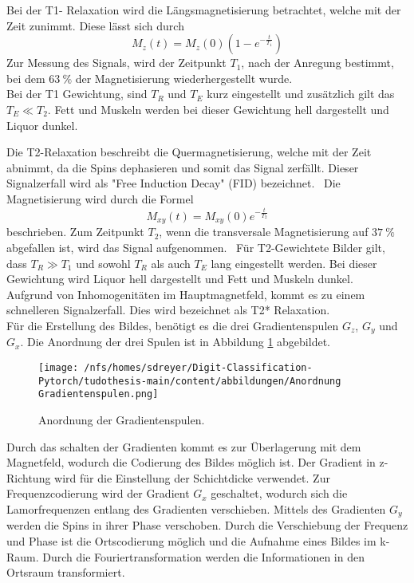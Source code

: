 Bei der T1- Relaxation wird die Längsmagnetisierung betrachtet, welche mit der Zeit zunimmt.
Diese lässt sich durch 
\begin{equation}
    M_z(t) = M_z(0) (1 - e^{-\frac{t}{T_1}})
\end{equation}
Zur Messung des Signals, wird der Zeitpunkt $T_1$, nach der Anregung bestimmt, bei dem $\qty{63}{\%}$ der Magnetisierung wiederhergestellt wurde.~\cite{Pollmann}\\
Bei der T1 Gewichtung, sind $T_R$ und $T_E$ kurz eingestellt und zusätzlich gilt das $T_E \ll T_2$.
Fett und Muskeln werden bei dieser Gewichtung hell dargestellt und Liquor dunkel.~\cite{Schlegel}

Die T2-Relaxation beschreibt die Quermagnetisierung, welche mit der Zeit abnimmt, da die Spins dephasieren und somit das Signal zerfällt.
Dieser Signalzerfall wird als "Free Induction Decay" (FID) bezeichnet.~\cite{Dössel}
Die Magnetisierung wird durch die Formel
\begin{equation}
    M_{xy}(t) = M_{xy}(0) e^{-\frac{t}{T_2}} 
\end{equation}
beschrieben.
Zum Zeitpunkt $T_2$, wenn die transversale Magnetisierung auf $\qty{37}{\%}$ abgefallen ist, wird das Signal aufgenommen.~\cite{Pollmann}
Für T2-Gewichtete Bilder gilt, dass $T_R \gg T_1$ und sowohl $T_R$ als auch $T_E$  lang eingestellt werden. 
Bei dieser Gewichtung wird Liquor hell dargestellt und Fett und Muskeln dunkel.~\cite{Schlegel} 
Aufgrund von Inhomogenitäten im Hauptmagnetfeld, kommt es zu einem schnelleren Signalzerfall. Dies wird bezeichnet als T2* Relaxation.~\cite{Dössel}\\


Für die Erstellung des Bildes, benötigt es die drei Gradientenspulen $G_z$, $G_y$ und $G_x$. Die Anordnung der drei Spulen 
ist in Abbildung \ref{fig:an Grad} abgebildet.
\begin{figure}[htbp]
  \centering
  \texttt{[image: /nfs/homes/sdreyer/Digit-Classification-Pytorch/tudothesis-main/content/abbildungen/Anordnung Gradientenspulen.png]}
  \caption{Anordnung der Gradientenspulen.\cite{Schlegel}}
  \label{fig:an Grad}
\end{figure}
Durch das schalten der Gradienten kommt es zur Überlagerung mit dem Magnetfeld, wodurch die Codierung des Bildes möglich ist.
Der Gradient in z-Richtung wird für die Einstellung der Schichtdicke verwendet. 
Zur Frequenzcodierung wird der Gradient $G_x$ geschaltet, wodurch sich die Lamorfrequenzen entlang des Gradienten verschieben.
Mittels des Gradienten $G_y$ werden die Spins in ihrer Phase verschoben.
Durch die Verschiebung der Frequenz und Phase ist die Ortscodierung möglich und die Aufnahme eines Bildes im k-Raum.
Durch die Fouriertransformation werden die Informationen in den Ortsraum transformiert.~\cite{pabst2013}


